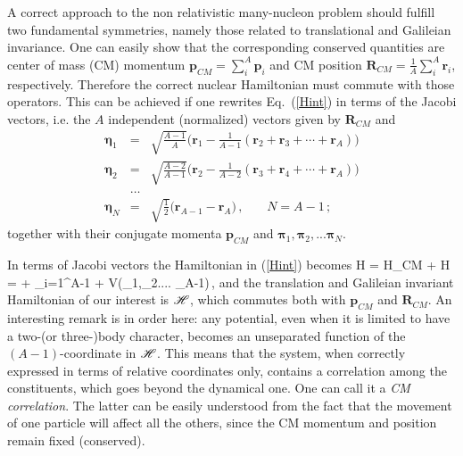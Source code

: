 A correct approach to the non relativistic many-nucleon problem  should fulfill 
two fundamental symmetries, namely those related to translational and Galileian invariance. One can easily show that the 
corresponding conserved quantities  are center of mass (CM) momentum 
$ \mathbf{p}_{CM} = \sum_i^A \mathbf{p}_i $ and CM position  $ \mathbf{R}_{CM} = \frac{1}{A}\sum_i^A \mathbf{r}_i $, respectively. 
Therefore the correct nuclear Hamiltonian must commute with those operators. This can be achieved if one rewrites  
Eq.~(\ref{Hint}) in terms of the Jacobi vectors, i.e. the $A$ independent (normalized) vectors  given by
$ \mathbf{R}_{CM}$ and  
\begin{eqnarray} \label{jacobi}
  \mathbf{\eta}_1 & = & \sqrt{\frac{A-1}{A}}\Big(\mathbf{r}_1 
                - \frac{1}{A-1}(\mathbf{r}_2 + \mathbf{r}_3 + \cdots
                + \mathbf{r}_{A} )\Big)  \nonumber \\
  \mathbf{\eta}_2 & = & \sqrt{\frac{A-2}{A-1}}\Big(\mathbf{r}_{2} 
               - \frac{1}{A-2}(\mathbf{r}_3 + \mathbf{r}_4 + \cdots
               + \mathbf{r}_{A} )\Big)  \nonumber \\
  &\ldots&  \nonumber \\ 
  \mathbf{\eta}_{N} & = & \sqrt{\frac{1}{2}}\Big(\mathbf{r}_{A-1}
                        - \mathbf{r}_{A} \Big) \,,\,\,\,\,\,\,\,\,\,\,\, N=A-1\,;
\end{eqnarray} 
together with their conjugate momenta $\mathbf{p}_{CM}$ and $\mathbf{\pi}_1, \mathbf{\pi}_2, ... \mathbf{\pi}_N$.

In terms of Jacobi vectors the Hamiltonian in (\ref{Hint}) becomes 
\be\label{Hlab}
H = H_{CM} + {\cal H} =  + \sum_{i=1}^{A-1}  + V(\mathbf{\eta}_1,\mathbf{\eta}_2.... \mathbf{\eta}_{A-1})\,,
\ee
and the translation and Galileian invariant Hamiltonian of our interest is ${\cal H}$, which commutes both with $ \mathbf{p}_{CM}$ and 
$ \mathbf{R}_{CM}$.
An interesting remark is in order here:
any potential, even when it is limited to have a two-(or three-)body character, becomes an unseparated function of the $(A-1)$-coordinate 
in ${\cal H}$. 
This means that the system, when correctly expressed in terms of relative coordinates only, contains a correlation among the constituents, 
which goes beyond the dynamical one. One can call it a {\it CM correlation}. The latter  can be easily understood from the fact that
the movement of one particle will affect all the others, since the CM momentum and position remain fixed (conserved).


